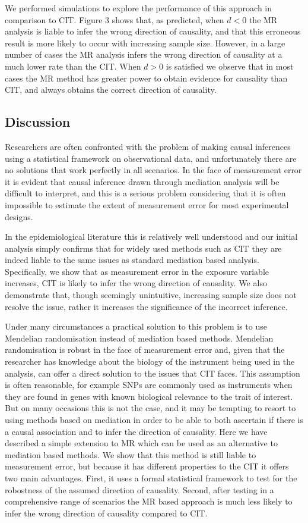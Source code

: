 \documentclass[]{article}
\begin{document}
We performed simulations to explore the performance of this approach in
comparison to CIT. Figure 3 shows that, as predicted, when \(d < 0\) the
MR analysis is liable to infer the wrong direction of causality, and
that this erroneous result is more likely to occur with increasing
sample size. However, in a large number of cases the MR analysis infers
the wrong direction of causality at a much lower rate than the CIT. When
\(d > 0\) is satisfied we observe that in most cases the MR method has
greater power to obtain evidence for causality than CIT, and always
obtains the correct direction of causality.

\subsection{Discussion}\label{discussion}

Researchers are often confronted with the problem of making causal
inferences using a statistical framework on observational data, and
unfortunately there are no solutions that work perfectly in all
scenarios. In the face of measurement error it is evident that causal
inference drawn through mediation analysis will be difficult to
interpret, and this is a serious problem considering that it is often
impossible to estimate the extent of measurement error for most
experimental designs.

In the epidemiological literature this is relatively well understood and
our initial analysis simply confirms that for widely used methods such
as CIT they are indeed liable to the same issues as standard mediation
based analysis. Specifically, we show that as measurement error in the
exposure variable increases, CIT is likely to infer the wrong direction
of causality. We also demonstrate that, though seemingly unintuitive,
increasing sample size does not resolve the issue, rather it increases
the significance of the incorrect inference.

Under many circumstances a practical solution to this problem is to use
Mendelian randomisation instead of mediation based methods. Mendelian
randomisation is robust in the face of measurement error and, given that
the researcher has knowledge about the biology of the instrument being
used in the analysis, can offer a direct solution to the issues that CIT
faces. This assumption is often reasonable, for example SNPs are
commonly used as instruments when they are found in genes with known
biological relevance to the trait of interest. But on many occasions
this is not the case, and it may be tempting to resort to using methods
based on mediation in order to be able to both ascertain if there is a
causal association and to infer the direction of causality. Here we have
described a simple extension to MR which can be used as an alternative
to mediation based methods. We show that this method is still liable to
measurement error, but because it has different properties to the CIT it
offers two main advantages. First, it uses a formal statistical
framework to test for the robostness of the assumed direction of
causality. Second, after testing in a comprehensive range of scenarios
the MR based approach is much less likely to infer the wrong direction
of causality compared to CIT.
\end{document}
